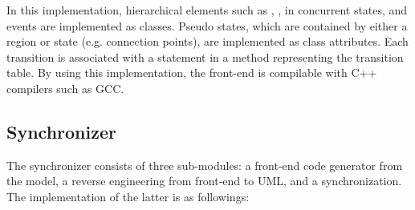 In this implementation, hierarchical elements such as , ,  in concurrent states, and events are implemented as classes.
Pseudo states, which are contained by either a region or state (e.g. connection points), are implemented as class attributes.
Each transition is associated with a statement in a method representing the transition table.
By using this implementation, the front-end is compilable with C++ compilers such as GCC.

\subsection{Synchronizer}
The synchronizer consists of three sub-modules: a front-end code generator from the model, a reverse engineering from front-end to UML, and a synchronization.
The implementation of the latter is as followings:

\noindent
